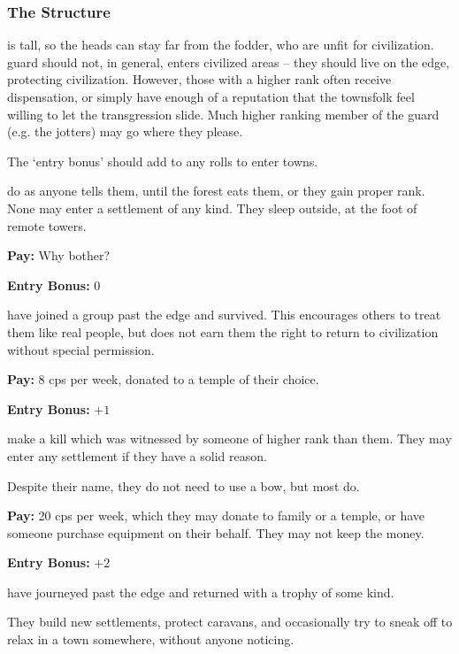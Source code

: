 \begin{multicols}{2}
\subsubsection{The Structure}
is tall, so the heads can stay far from the fodder, who are unfit for civilization.
\Gls{guard} should not, in general, enters civilized areas -- they should live on the \gls{edge}, protecting civilization.
However, those with a higher rank often receive dispensation, or simply have enough of a reputation that the townsfolk feel willing to let the transgression slide.
Much higher ranking member of the \gls{guard} (e.g. the \glspl{jotter}) may go where they please.

The `entry bonus' should add to any rolls to enter towns.

\begin{description}
  \label{fodder}%
  do as anyone tells them, until the forest eats them, or they gain proper rank.
  None may enter a settlement of any kind.
  They sleep outside, at the foot of remote towers.

  \textbf{Pay:} Why bother?

  \textbf{Entry Bonus:} $0$

  have joined a group past the \gls{edge} and survived.
  This encourages others to treat them like real people, but does not earn them the right to return to civilization without special permission.

  \textbf{Pay:} 8 \glspl{cp} per week, donated to a temple of their choice.

  \textbf{Entry Bonus:} $+1$

  make a kill which was witnessed by someone of higher rank than them.
  They may enter any settlement if they have a solid reason.

  Despite their name, they do not need to use a bow, but most do.

  \textbf{Pay:} 20 \glspl{cp} per week, which they may donate to family or a temple, or have someone purchase equipment on their behalf.
  They may not keep the money.

  \textbf{Entry Bonus:} $+2$

  have journeyed past the \gls{edge} and returned with a trophy of some kind.

  They build new settlements, protect caravans, and occasionally try to sneak off to relax in a town somewhere, without anyone noticing.


\end{description}
\end{multicols}
